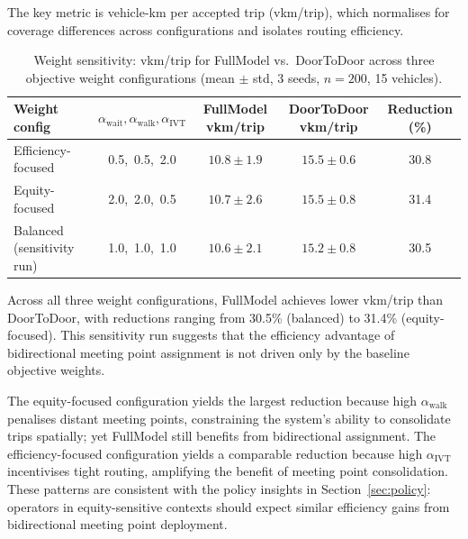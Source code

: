 The key metric is vehicle-km per accepted trip (vkm/trip), which normalises
for coverage differences across configurations and isolates routing efficiency.

\begin{table}[h]
\centering
\caption{Weight sensitivity: vkm/trip for FullModel vs.\ DoorToDoor across three
         objective weight configurations (mean $\pm$ std, 3 seeds, $n=200$, 15 vehicles).}
\label{tab:weight-sensitivity}
\begin{tabular}{lcccc}
\toprule
Weight config & $\alpha_{\text{wait}}, \alpha_{\text{walk}}, \alpha_{\text{IVT}}$ &
FullModel vkm/trip & DoorToDoor vkm/trip & Reduction (\%) \\
\midrule
Efficiency-focused & 0.5,\ 0.5,\ 2.0 & $10.8 \pm 1.9$ & $15.5 \pm 0.6$ & 30.8 \\
Equity-focused     & 2.0,\ 2.0,\ 0.5 & $10.7 \pm 2.6$ & $15.5 \pm 0.8$ & 31.4 \\
Balanced (sensitivity run)& 1.0,\ 1.0,\ 1.0 & $10.6 \pm 2.1$ & $15.2 \pm 0.8$ & 30.5 \\
\bottomrule
\end{tabular}
\end{table}

Across all three weight configurations, FullModel achieves lower vkm/trip than
DoorToDoor, with reductions ranging from 30.5\% (balanced) to 31.4\%
(equity-focused). This sensitivity run suggests that the efficiency advantage of
bidirectional meeting point assignment is not driven only by the baseline objective
weights.

The equity-focused configuration yields the largest reduction because high
$\alpha_{\text{walk}}$ penalises distant meeting points, constraining the
system's ability to consolidate trips spatially; yet FullModel still benefits
from bidirectional assignment. The efficiency-focused configuration yields a
comparable reduction because high $\alpha_{\text{IVT}}$ incentivises tight
routing, amplifying the benefit of meeting point consolidation.
These patterns are consistent with the policy insights in
Section~\ref{sec:policy}: operators in equity-sensitive contexts should expect
similar efficiency gains from bidirectional meeting point deployment.
